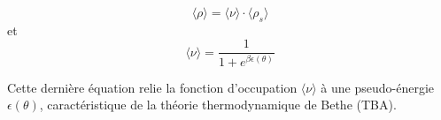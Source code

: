 \begin{equation}
\langle \rho \rangle = \langle \nu \rangle \cdot \langle \rho_s \rangle
\end{equation}
et
\begin{equation}
\langle \nu \rangle = \frac{1}{1 + e^{\beta \epsilon(\theta)}}
\end{equation}

Cette dernière équation relie la fonction d’occupation \( \langle \nu \rangle \) à une pseudo-énergie \( \epsilon(\theta) \), caractéristique de la théorie thermodynamique de Bethe (TBA).

%


